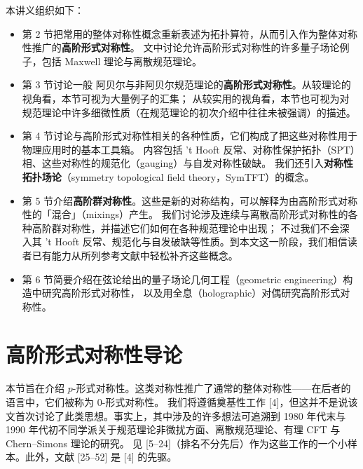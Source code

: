 本讲义组织如下：
\begin{itemize}[leftmargin=1.6em,itemsep=2pt,topsep=2pt]
\item 第 2 节把常用的整体对称性概念重新表述为拓扑算符，从而引入作为整体对称性推广的\textbf{高阶形式对称性}。
  文中讨论允许高阶形式对称性的许多量子场论例子，包括 Maxwell 理论与离散规范理论。
\item 第 3 节讨论一般 阿贝尔与非阿贝尔规范理论的\textbf{高阶形式对称性}。从较理论的视角看，本节可视为大量例子的汇集；
  从较实用的视角看，本节也可视为对规范理论中许多细微性质（在规范理论的初次介绍中往往未被强调）的描述。
\item 第 4 节讨论与高阶形式对称性相关的各种性质，它们构成了把这些对称性用于物理应用时的基本工具箱。
  内容包括 't Hooft 反常、对称性保护拓扑（SPT）相、这些对称性的规范化（gauging）与自发对称性破缺。
  我们还引入\textbf{对称性拓扑场论}（symmetry topological field theory，SymTFT）的概念。
\item 第 5 节介绍\textbf{高阶群对称性}。这些是新的对称结构，可以解释为由高阶形式对称性的「混合」（mixings）产生。
  我们讨论涉及连续与离散高阶形式对称性的各种高阶群对称性，并描述它们如何在各种规范理论中出现；
  不过我们不会深入其 't Hooft 反常、规范化与自发破缺等性质。到本文这一阶段，我们相信读者已有能力从所列参考文献中轻松补齐这些概念。
\item 第 6 节简要介绍在弦论给出的量子场论几何工程（geometric engineering）构造中研究高阶形式对称性，
  以及用全息（holographic）对偶研究高阶形式对称性。
\end{itemize}


\section{高阶形式对称性导论}

本节旨在介绍 $p$-形式对称性。这类对称性推广了通常的整体对称性——在后者的语言中，它们被称为 0-形式对称性。
我们将遵循奠基性工作 [4]，但这并不是说该文首次讨论了此类思想。事实上，其中涉及的许多想法可追溯到
1980 年代末与 1990 年代初不同学派关于规范理论非微扰方面、离散规范理论、有理 CFT 与 Chern--Simons 理论的研究。
见 [5--24]（排名不分先后）作为这些工作的一个小样本。此外，文献 [25--52] 是 [4] 的先驱。

